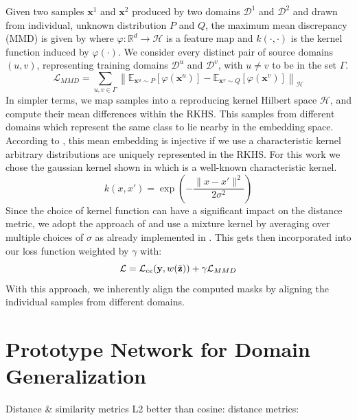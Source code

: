 Given two samples $\mathbf{x}^1$ and $\mathbf{x}^2$ produced by two domains $\mathcal{D}^1$ and $\mathcal{D}^2$ and drawn from individual, unknown distribution $P$ and $Q$, the maximum mean discrepancy (MMD) is given by  where $\varphi: \mathbb{R}^{d} \rightarrow \mathcal{H}$ is a feature map and $k(\cdot, \cdot)$ is the kernel function induced by $\varphi(\cdot)$. We consider every distinct pair of source domains $(u,v)$, representing training domains $\mathcal{D}^u$ and $\mathcal{D}^v$, with $u\neq v$ to be in the set $\Gamma$.
\begin{equation}
\label{eq:mmd_maps}
    \mathcal{L}_{MMD} =\sum_{u,v \in \Gamma}\left\|\mathbb{E}_{\mathbf{x}^u \sim P}[\varphi(\mathbf{x}^u)]-\mathbb{E}_{\mathbf{x}^v \sim Q}[\varphi(\mathbf{x}^v)]\right\|_{\mathcal{H}}
\end{equation}
In simpler terms, we map samples into a reproducing kernel Hilbert space $\mathcal{H}$, and compute their mean differences within the RKHS. This samples from different domains which represent the same class to lie nearby in the embedding space. According to \citet{SriperumbudurFGLS09}, this mean embedding is injective if we use a characteristic kernel \ie arbitrary distributions are uniquely represented in the RKHS. For this work we chose the gaussian kernel shown in  which is a well-known characteristic kernel.
\begin{equation}
\label{eq:gaussian_kernel}
    k(x,x') = \exp \left(-\frac{\|x-x'\|^{2}}{2 \sigma^{2}}\right)
\end{equation}
Since the choice of kernel function can have a significant impact on the distance metric, we adopt the approach of \citet{LiPWK18} and use a mixture kernel by averaging over multiple choices of $\sigma$ as already implemented in \domainbed. This gets then incorporated into our loss function weighted by $\gamma$ with:
\begin{equation}
    \mathcal{L} = \mathcal{L}_{ce}(\mathbf{y}, w(\Tilde{\mathbf{z}}))+\gamma \mathcal{L}_{MMD}
\end{equation}
With this approach, we inherently align the computed masks by aligning the individual samples from different domains. 

\section{Prototype Network for Domain Generalization}
Distance \& similarity metrics
L2 better than cosine: \citep{SnellSZ17}
distance metrics: \citep{BanerjeeMDG04}

